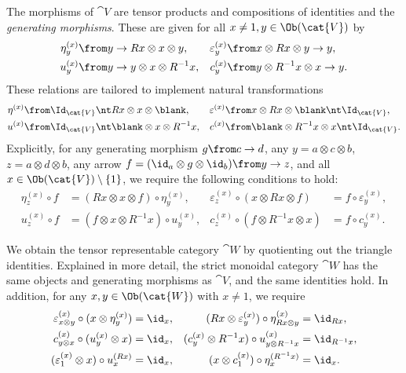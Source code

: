 The morphisms of \(\cat{V}\) are tensor products and compositions of identities and the \emph{generating morphisms}.
These are given for all \(x \neq 1, y \in \Ob(\cat{V})\) by
\begin{align*}
  \eta^{(x)}_{y}&\from y \to Rx \otimes x \otimes y,
  & \varepsilon^{(x)}_{y} &\from x \otimes Rx \otimes y\to y,\\
  u^{(x)}_{y} &\from y \to y \otimes x \otimes R^{-1}x,
  & c^{(x)}_{y} &\from y\otimes R^{-1}x \otimes x \to y.
\end{align*}
These relations are tailored to implement natural transformations
\begin{align*}
  \eta^{(x)} &\from \Id_{\cat{V}} \nt Rx \otimes x \otimes \blank, &
  \varepsilon^{(x)} &\from x \otimes Rx \otimes \blank \nt \Id_{\cat{V}}, \\
  u^{(x)} &\from \Id_{\cat{V}} \nt \blank \otimes x \otimes R^{-1}x, &
  c^{(x)} & \from \blank \otimes R^{-1}x \otimes x \nt \Id_{\cat{V}}.
\end{align*}
Explicitly,
for any generating morphism \(g \from c\to d\),
any \(y = a \otimes c \otimes b\), \(z= a \otimes d \otimes b\),
any arrow \(f = (\id_a \otimes g \otimes \id_b) \from y\to z\),
and all \(x \in \Ob(\cat{V}) \setminus \{1\}\),
we require the following conditions to hold:
\begin{align*}
  \eta^{(x)}_{z} \circ f &= (Rx \otimes x \otimes f) \circ \eta^{(x)}_{y},
  & \varepsilon^{(x)}_{z} \circ (x \otimes Rx \otimes f) &= f \circ \varepsilon^{(x)}_{y},\\
  u^{(x)}_{z} \circ f &= (f \otimes x \otimes R^{-1}x) \circ u^{(x)}_{y},
  & c^{(x)}_{z} \circ (f \otimes R^{-1} x\otimes x) &= f \circ c^{(x)}_{y}.
\end{align*}

We obtain the tensor representable category \(\cat{W}\)
by quotienting out the triangle identities.
Explained in more detail, the strict monoidal category \(\cat{W}\) has the same objects and generating morphisms as \(\cat{V}\),
and the same identities hold.
In addition, for any \(x,y \in \Ob(\cat{W})\) with \(x \neq 1\), we require
\begin{equation}\label{eq:defining-relations-of-c}
  \begin{aligned}
    \varepsilon^{(x)}_{x \otimes y} \circ (x \otimes \eta^{(x)}_y) &= \id_x, &
    (Rx \otimes \varepsilon^{(x)}_{y}) \circ \eta^{(x)}_{Rx \otimes y} &= \id_{Rx},\\
    c^{(x)}_{y\otimes x} \circ (u^{(x)}_{y} \otimes x) &= \id_{x}, &
    (c^{(x)}_{y} \otimes R^{-1}x) \circ u^{(x)}_{y \otimes R^{-1}x}&= \id_{R^{-1}x},\\
    (\varepsilon^{(x)}_1 \otimes x) \circ u^{(Rx)}_{x} &= \id_x, &
    (x \otimes c^{(x)}_1) \circ \eta^{(R^{-1}x)}_{x} &= \id_x.
  \end{aligned}
\end{equation}

